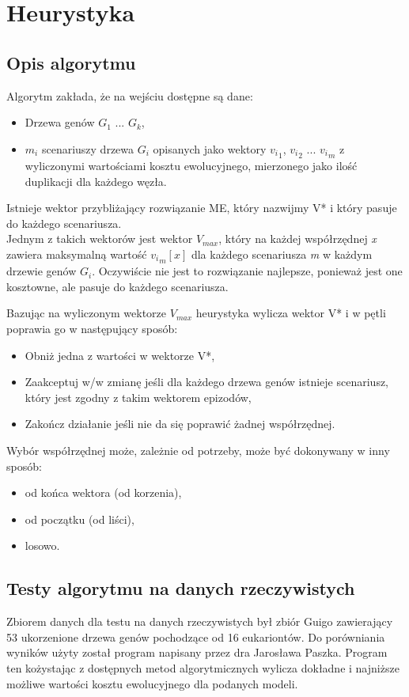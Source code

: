 \documentclass[licencjacka]{pracamgr}
\begin{document}
\chapter{Heurystyka}\label{r:heurystyka}

\section{Opis algorytmu}

Algorytm zakłada, że na wejściu dostępne są dane:
\begin{itemize}
\item Drzewa genów $G_1$ ... $G_k$,
\item $m_i$ scenariuszy drzewa $G_i$ opisanych jako wektory ${v_i}_1$, ${v_i}_2$ ... ${v_i}_m$ z wyliczonymi wartościami kosztu ewolucyjnego, mierzonego jako ilość duplikacji dla każdego węzła.
\end{itemize}
Istnieje wektor przybliżający rozwiązanie ME, który nazwijmy V* i który pasuje do każdego scenariusza. \\
Jednym z takich wektorów jest wektor $V_{max}$, który na każdej współrzędnej \textit{x} zawiera maksymalną wartość ${{v_i}_m}[x]$ dla każdego scenariusza \textit{m} w każdym drzewie genów $G_i$. Oczywiście nie jest to rozwiązanie najlepsze, ponieważ jest one kosztowne, ale pasuje do każdego scenariusza.

Bazując na wyliczonym wektorze $V_{max}$ heurystyka wylicza wektor V* i w pętli poprawia go w następujący sposób:
\begin{itemize}
\item Obniż jedna z wartości w wektorze V*,
\item Zaakceptuj w/w zmianę jeśli dla każdego drzewa genów istnieje scenariusz, który jest zgodny z takim wektorem epizodów,
\item Zakończ działanie jeśli nie da się poprawić żadnej współrzędnej.
\end{itemize}
Wybór współrzędnej może, zależnie od potrzeby, może być dokonywany w inny sposób:
\begin{itemize}
\item od końca wektora (od korzenia),
\item od początku (od liści),
\item losowo.
\end{itemize}

\section{Testy algorytmu na danych rzeczywistych}
Zbiorem danych dla testu na danych rzeczywistych był zbiór Guigo zawierający 53 ukorzenione drzewa genów pochodzące od 16 eukariontów. Do porówniania wyników użyty został program napisany przez dra Jarosława Paszka. Program ten kożystając z dostępnych metod algorytmicznych wylicza dokładne i najniższe możliwe wartości kosztu ewolucyjnego dla podanych modeli.
\end{document}
